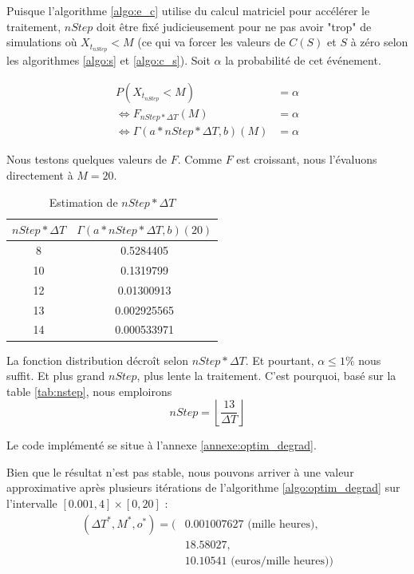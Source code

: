 \documentclass[10pt,a4paper]{article}
\begin{document}
\FloatBarrier
Puisque l'algorithme \eqref{algo:e_c} utilise du calcul matriciel pour accélérer le traitement, $nStep$ doit être fixé judicieusement pour ne pas avoir "trop" de simulations où $X_{t_{nStep}} < M$ (ce qui va forcer les valeurs de $C(S)$ et $S$ à zéro selon les algorithmes \eqref{algo:s} et \eqref{algo:c_s}). Soit $\alpha$ la probabilité de cet événement.

\begin{align*}
    P\left( {{X_{{t_{nStep}}}} < M} \right) & = \alpha  \\
    \Leftrightarrow {F_{nStep*\Delta T}}\left( M \right) & = \alpha \\
    \Leftrightarrow \Gamma \left( {a*nStep*\Delta T,b} \right)\left( M \right) & = \alpha 
\end{align*}

Nous testons quelques valeurs de $F$. Comme $F$ est croissant, nous l'évaluons directement à $M=20$.

\begin{table}[!h]
    \centering
    \begin{tabular}{|c|c|}
      \hline
      $nStep * \Delta T$ &  $\Gamma \left( {a*nStep*\Delta T,b} \right)\left( 20 \right)$\\
      \hline
      8 & 0.5284405 \\
      10 & 0.1319799 \\
      12 & 0.01300913 \\
      13 & 0.002925565 \\
      14 & 0.000533971 \\
      \hline
    \end{tabular}
    \caption{Estimation de $nStep * \Delta T$}
    \label{tab:nstep}
\end{table}

La fonction distribution décroît selon $nStep*\Delta T$. Et pourtant, $\alpha \leq 1\%$ nous suffit. Et plus grand $nStep$, plus lente la traitement. C'est pourquoi, basé sur la table \eqref{tab:nstep}, nous emploirons
\[nStep = \left\lfloor {\frac{{13}}{{\Delta T}}} \right\rfloor \]

Le code implémenté se situe à l'annexe \ref{annexe:optim_degrad}. 

Bien que le résultat n'est pas stable, nous pouvons arriver à une valeur approximative après plusieurs itérations de l'algorithme \ref{algo:optim_degrad} sur l'intervalle $[0.001, 4] \times [0, 20]$ : 
\begin{align*}
    (\Delta T^*, M^*, o^*) = (& 0.001007627 \text{ (mille heures)},\\
    & 18.58027,\\
    & 10.10541 \text{ (euros/mille heures)})
\end{align*}
\end{document}
